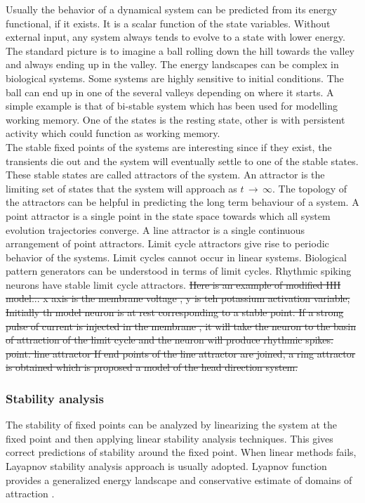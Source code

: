 Usually the behavior of a dynamical system can be predicted from its energy functional, if it exists. It is a scalar function of the state variables. Without external input, any system always tends to evolve to a state with lower energy. The standard picture is to imagine a ball rolling down the hill towards the valley and always ending up in the valley. The energy landscapes can be complex in biological systems. Some systems are highly sensitive to initial conditions. The ball can end up in one of the several valleys depending on where it starts. A simple example is that of bi-stable system which has been used for modelling working memory. One of the states is the resting state, other is with persistent activity which could function as working memory.\\
The stable fixed points of the systems are interesting since if they exist, the transients die out and the system will eventually settle to one of the stable states. These stable states are called attractors of the system. An attractor is the limiting set of states that the system will approach as $t\, \rightarrow \, \infty $. The topology of the attractors can be helpful in predicting the long term behaviour of a system. A point attractor is a single point in the state space towards which all system evolution trajectories converge. A line attractor is a single continuous arrangement of point attractors. Limit cycle attractors give rise to periodic behavior of the systems. Limit cycles cannot occur in linear systems. Biological pattern generators can be understood in terms of limit cycles. Rhythmic spiking neurons have stable limit cycle attractors.  \st{Here is an example of modified HH model... x axis is the membrane voltage , y is teh potassium activation variable, Initially th model neuron is at rest corresponding to a stable point. If a strong pulse of current is injected in the membrane , it will take the neuron to the basin of attraction of the limit cycle and the neuron will produce rhythmic spikes.} \\
\st{point. line attractor If end points of the line attractor are joined, a ring attractor is obtained which is proposed a model of the head direction system.} \\

\subsubsection{Stability analysis}
The stability of fixed points can be analyzed by linearizing the system at the fixed point and then applying linear stability analysis techniques. This gives correct predictions of stability around the fixed point. When linear methods fails, Layapnov stability analysis approach is usually adopted. Lyapnov function provides a generalized energy landscape and conservative estimate of domains of attraction . 
\\
